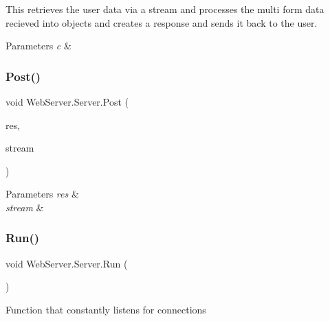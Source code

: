 This retrieves the user data via a stream and processes the multi form data recieved into objects and creates a response and sends it back to the user. 


\begin{DoxyParams}{Parameters}
{\em c} & \\
\hline
\end{DoxyParams}
\mbox{\label{class_web_server_1_1_server_ab337c60d132ca49465d17cac9328b23b}} 
\subsubsection{\texorpdfstring{Post()}{Post()}}
{\footnotesize\ttfamily void Web\+Server.\+Server.\+Post (\begin{DoxyParamCaption}\item[{\hyperlink{class_web_server_1_1_response}{Response}}]{res,  }\item[{Http\+Listener\+Response}]{stream }\end{DoxyParamCaption})}






\begin{DoxyParams}{Parameters}
{\em res} & \\
\hline
{\em stream} & \\
\hline
\end{DoxyParams}
\mbox{\label{class_web_server_1_1_server_a83ce026fab9839ed0ca193977c50bb7b}} 
\subsubsection{\texorpdfstring{Run()}{Run()}}
{\footnotesize\ttfamily void Web\+Server.\+Server.\+Run (\begin{DoxyParamCaption}{ }\end{DoxyParamCaption})}



Function that constantly listens for connections 

\mbox{\label{class_web_server_1_1_server_af6882e9fbb66cb27880198a0c0bb301b}} 

